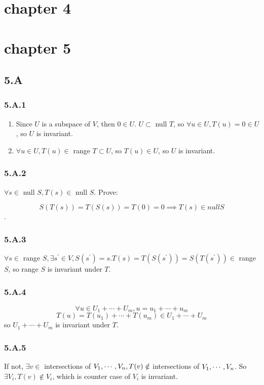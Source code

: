 \section{chapter 4}
\section{chapter 5}
\subsection*{5.A}
\subsubsection*{5.A.1}

\begin{enumerate}[label=(\alph*)]
\item Since $U$ is a subspace of $V$, then $0\in U$. $U\subset $ null $T$, so $\forall u\in U, T(u) = 0 \in U $, so $U$ is invariant.
\item $\forall u\in U, T(u)\in $ range $T \subset U$, so $T(u) \in U$, so $U$ is invariant.
\end{enumerate}

\subsubsection*{5.A.2}

$\forall s \in $ null $S, T(s) \in $ null $S$. Prove:

\[S(T(s)) = T(S(s)) = T(0) = 0 \implies T(s) \in null S \].

\subsubsection*{5.A.3}

$\forall s \in $ range $S, \exists s^{'} \in V, S(s^{'}) = s. T(s) = T(S(s^{'})) = S(T(s^{'})) \in $ range $S$, so range $S$ is invariant under $T$.

\subsubsection*{5.A.4}

\[\forall u \in U_{1} + \cdots + U_{m}, u = u_{1} + \cdots + u_{m} \]
\[T(u) = T(u_{1}) + \cdots + T(u_{m}) \in U_{1} + \cdots + U_{m} \]
so $U_{1} + \cdots + U_{m}$ is invariant under $T$.

\subsubsection*{5.A.5}
If not, $\exists v \in $ intersections of $V_{1},\cdots,V_{n}, T(v) \notin $ intersections of $V_{1},\cdots,V_{n}$. 
So $\exists V_{i}, T(v) \notin V_{i}$, which is counter case of $V_{i}$ is invariant.

